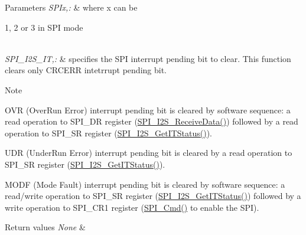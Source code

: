 \begin{DoxyParams}{Parameters}
{\em S\-P\-Ix,\-:} & where x can be
\begin{DoxyItemize}
\item 1, 2 or 3 in S\-P\-I mode 
\end{DoxyItemize}\\
\hline
{\em S\-P\-I\-\_\-\-I2\-S\-\_\-\-I\-T,\-:} & specifies the S\-P\-I interrupt pending bit to clear. This function clears only C\-R\-C\-E\-R\-R intetrrupt pending bit. \\
\hline
\end{DoxyParams}
\begin{DoxyNote}{Note}

\begin{DoxyItemize}
\item O\-V\-R (Over\-Run Error) interrupt pending bit is cleared by software sequence\-: a read operation to S\-P\-I\-\_\-\-D\-R register (\hyperlink{group___s_p_i___exported___functions_gab77de76547f3bff403236b263b070a30}{S\-P\-I\-\_\-\-I2\-S\-\_\-\-Receive\-Data()}) followed by a read operation to S\-P\-I\-\_\-\-S\-R register (\hyperlink{group___s_p_i___exported___functions_ga72decbc1cd79f8fad92a2204beca6bc5}{S\-P\-I\-\_\-\-I2\-S\-\_\-\-Get\-I\-T\-Status()}).
\item U\-D\-R (Under\-Run Error) interrupt pending bit is cleared by a read operation to S\-P\-I\-\_\-\-S\-R register (\hyperlink{group___s_p_i___exported___functions_ga72decbc1cd79f8fad92a2204beca6bc5}{S\-P\-I\-\_\-\-I2\-S\-\_\-\-Get\-I\-T\-Status()}).
\item M\-O\-D\-F (Mode Fault) interrupt pending bit is cleared by software sequence\-: a read/write operation to S\-P\-I\-\_\-\-S\-R register (\hyperlink{group___s_p_i___exported___functions_ga72decbc1cd79f8fad92a2204beca6bc5}{S\-P\-I\-\_\-\-I2\-S\-\_\-\-Get\-I\-T\-Status()}) followed by a write operation to S\-P\-I\-\_\-\-C\-R1 register (\hyperlink{group___s_p_i___exported___functions_gaa31357879a65ee1ed7223f3b9114dcf3}{S\-P\-I\-\_\-\-Cmd()} to enable the S\-P\-I). 
\end{DoxyItemize}
\end{DoxyNote}

\begin{DoxyRetVals}{Return values}
{\em None} & \\
\hline
\end{DoxyRetVals}


